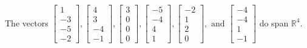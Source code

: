 \begin{exercise}
\begin{exerciseStatement}
  \end{exerciseStatement}
  \begin{exerciseAnswer}
   The vectors \(\left[\begin{array}{r}
1 \\
-3 \\
-5 \\
-2
\end{array}\right] , \left[\begin{array}{r}
4 \\
3 \\
-4 \\
-1
\end{array}\right] , \left[\begin{array}{r}
3 \\
0 \\
0 \\
0
\end{array}\right] , \left[\begin{array}{r}
-5 \\
-4 \\
4 \\
1
\end{array}\right] , \left[\begin{array}{r}
-2 \\
1 \\
2 \\
0
\end{array}\right] , \text{ and } \left[\begin{array}{r}
-4 \\
-4 \\
1 \\
-1
\end{array}\right]\) 
  	 do  
	span \(\mathbb{R}^4\).
  


  \end{exerciseAnswer}
\end{exercise}
